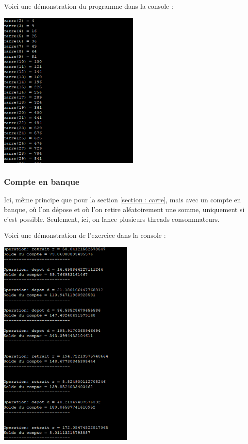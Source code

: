 \documentclass{article}
\begin{document}
Voici une démonstration du programme dans la console :
\begin{center}
\includegraphics{ex2_1.png}
\end{center}

\subsubsection{Compte en banque}
\label{section : banque}

Ici, même principe que pour la section \ref{section : carre}, mais avec un compte en banque, où l'on dépose et où l'on retire aléatoirement une somme, uniquement si c'est possible. Seulement, ici, on lance plusieurs threads consommateurs.

Voici une démonstration de l'exercice dans la console :
\begin{center}
\includegraphics{ex2_2.png}
\end{center}
\end{document}
